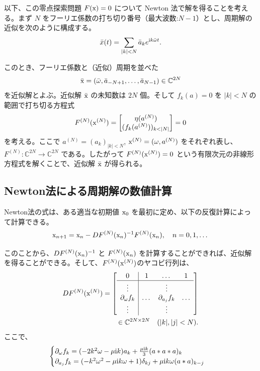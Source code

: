 以下、この零点探索問題 $F(\mathrm x)=0$ について Newton 法で解を得ることを考える。まず $N$ をフーリエ係数の打ち切り番号（最大波数:$N-1$）とし、周期解の近似を次のように構成する。
$$
 \bar{x}(t) = \sum_{|k|<N} \bar{a}_k e^{\mathrm{i} k \bar\omega t}.
$$

このとき、フーリエ係数と（近似）周期を並べた
$$
    \bar{\mathrm x} = (\bar\omega, \bar{a}_{-N+1},\dots,\bar{a}_{N-1})\in \mathbb{C}^{2N}
$$
を近似解とよぶ。近似解 $\bar {\mathrm x}$ の未知数は $2N$ 個。そして $f_k(a)=0$ を $|k|<N$ の範囲で打ち切る方程式
$$
    F^{(N)}(\mathrm x^{(N)}) = 
    \begin{bmatrix}
    \eta (a^{(N)}) \\
    (f_k(a^{(N)}))_{k < |N|}
    \end{bmatrix}
    =0
$$
を考える。ここで $a^{(N)} = (a_k)_{|k|<N}$, $\mathrm x^{(N)} = (\omega,a^{(N)})$ をそれぞれ表し、$F^{(N)}:\mathbb{C}^{2N}\to \mathbb{C}^{2N}$ である。したがって $F^{(N)}(\mathrm x^{(N)}) = 0$ という有限次元の非線形方程式を解くことで、近似解 $\bar {\mathrm x}$ が得られる。

\subsection{Newton法による周期解の数値計算}

Newton法の式は、ある適当な初期値 $\mathrm x_0$ を最初に定め、以下の反復計算によって計算できる。
$$
    \mathrm x_{n+1} = \mathrm x_n - DF^{(N)}(\mathrm x_n)^{-1} F^{(N)}(\mathrm x_n),\quad n=0,1,\dots
$$

このことから、$DF^{(N)}(\mathrm x_n)^{-1}$ と $F^{(N)}(\mathrm x_n)$ を計算することができれば、近似解を得ることができる。そして、$F^{(N)}(\mathrm x^{(N)})$のヤコビ行列は、
\begin{align*}
    DF^{(N)}(\mathrm x^{(N)}) = 
    \left[\begin{array}{c|ccc}
    0 & 1 & \dots & 1\\\hline
    \vdots & &\vdots&\\
    \partial_{\omega}f_k& \dots & \partial_{a_j}f_k & \dots\\
    \vdots & &\vdots& 
    \end{array}\right]\\ \in\mathbb{C}^{2N\times 2N}\quad (|k|,|j|<N).
\end{align*}
ここで、
$$
    \begin{cases}
    \partial_\omega f_k = (-2k^2 \omega - \mu \mathrm{i} k) a_k + \frac{\mu \mathrm{i} k}{3}(a*a*a)_k\\
    \partial_{a_j} f_k = (-k^2 \omega^2 - \mu \mathrm{i} k \omega + 1) \delta_{kj} + \mu \mathrm{i} k \omega (a*a)_{k-j}
    \end{cases}
$$

